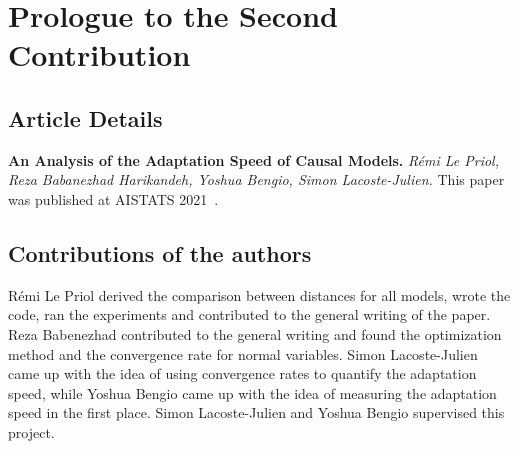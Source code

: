 \setcounter{corA}{0} %
\setcounter{theorem}{0}


\newcommand*{\entropy}{\mathcal{H}}
\newcommand*{\softargmax}{p \circ}

\newcommand*{\ptrue}{\ensuremath{\bm{p}}}
\newcommand*{\causalvar}{\theta_\rightarrow}
\newcommand*{\antivar}{\theta_\leftarrow}
\newcommand*{\pmodel}{\ensuremath{\bm{p}_{\causalvar}}}
\newcommand*{\panti}{\ensuremath{\bm{p}_{\antivar}}}

\newcommand*{\ptransfer}{\ptrue^*} 
\newcommand*{\natgauss}{\cN_\text{nat}}
\newcommand*{\chogauss}{\cN_\text{cho}}
\newcommand*{\Dir}{\mathrm{Dir}}
\newcommand*{\uniform}{\vu}
\newcommand*{\lr}{\gamma}

\newcommand{\mm}{m}
\newcommand{\logpartition}{A}
\newcommand{\alpin}{\alpha}
\newcommand{\nn}{n}
\newcommand{\logpartitionb}{B}
\newcommand{\betin}{\beta}
\newcommand{\red}[1]{{\color{red}#1}}

\newcommand*{\smoothness}{B}
\newcommand*{\strongconvexity}{\mu}
\newcommand*{\gradientvariance}{\sigma^2}



\chapter{Prologue to the Second Contribution}

\section{Article Details}

\textbf{An Analysis of the Adaptation Speed of Causal Models.} 
\emph{R\'emi Le Priol, Reza Babanezhad Harikandeh, Yoshua Bengio, Simon Lacoste-Julien.} 
This paper was published at AISTATS 2021~\citep{lepriol2021analysis}.

\section{Contributions of the authors}
Rémi Le Priol derived the comparison between distances for all models, wrote the code, ran the experiments and contributed to the general writing of the paper.
Reza Babenezhad contributed to the general writing and found the optimization method and the convergence rate for normal variables.
Simon Lacoste-Julien came up with the idea of using convergence rates to quantify the adaptation speed, while Yoshua Bengio came up with the idea of measuring the adaptation speed in the first place. 
Simon Lacoste-Julien and Yoshua Bengio supervised this project. 

